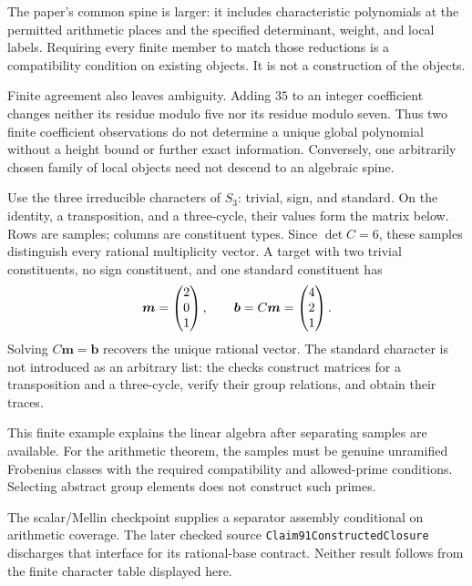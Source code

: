 The paper's common spine is larger: it includes characteristic polynomials at the permitted arithmetic places and the specified determinant, weight, and local labels. Requiring every finite member to match those reductions is a compatibility condition on existing objects. It is not a construction of the objects.

Finite agreement also leaves ambiguity. Adding $35$ to an integer coefficient changes neither its residue modulo five nor its residue modulo seven. Thus two finite coefficient observations do not determine a unique global polynomial without a height bound or further exact information. Conversely, one arbitrarily chosen family of local objects need not descend to an algebraic spine.

Use the three irreducible characters of $S_3$: trivial, sign, and standard. On the identity, a transposition, and a three-cycle, their values form the matrix below. Rows are samples; columns are constituent types.
Since $\det C=6$, these samples distinguish every rational multiplicity vector. A target with two trivial constituents, no sign constituent, and one standard constituent has
\[
\bm m=\begin{pmatrix}2\\0\\1\end{pmatrix},\qquad
\bm b=C\bm m=\begin{pmatrix}4\\2\\1\end{pmatrix}.
\]
Solving $C\bm m=\bm b$ recovers the unique rational vector. The standard character is not introduced as an arbitrary list: the checks construct matrices for a transposition and a three-cycle, verify their group relations, and obtain their traces.

This finite example explains the linear algebra after separating samples are available. For the arithmetic theorem, the samples must be genuine unramified Frobenius classes with the required compatibility and allowed-prime conditions. Selecting abstract group elements does not construct such primes.

The scalar/Mellin checkpoint supplies a separator assembly conditional on arithmetic coverage. The later checked source \texttt{Claim91ConstructedClosure} discharges that interface for its rational-base contract. Neither result follows from the finite character table displayed here.

